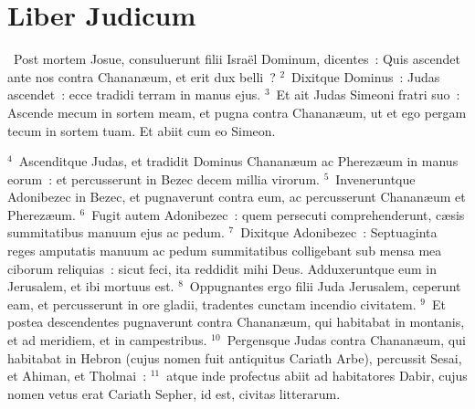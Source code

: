{\centering \section*{Liber Judicum}}\thispagestyle{empty}

~Post mortem Josue, consuluerunt filii Isra\"el Dominum, dicentes~: Quis ascendet ante nos contra Chanan\ae um, et erit dux belli~?
${}^{2}$~Dixitque Dominus~: Judas ascendet~: ecce tradidi terram in manus ejus.
${}^{3}$~Et ait Judas Simeoni fratri suo~: Ascende mecum in sortem meam, et pugna contra Chanan\ae um, ut et ego pergam tecum in sortem tuam. Et abiit cum eo Simeon.


${}^{4}$~Ascenditque Judas, et tradidit Dominus Chanan\ae um ac Pherez\ae um in manus eorum~: et percusserunt in Bezec decem millia virorum.
${}^{5}$~Inveneruntque Adonibezec in Bezec, et pugnaverunt contra eum, ac percusserunt Chanan\ae um et Pherez\ae um.
${}^{6}$~Fugit autem Adonibezec~: quem persecuti comprehenderunt, c\ae sis summitatibus manuum ejus ac pedum.
${}^{7}$~Dixitque Adonibezec~: Septuaginta reges amputatis manuum ac pedum summitatibus colligebant sub mensa mea ciborum reliquias~: sicut feci, ita reddidit mihi Deus. Adduxeruntque eum in Jerusalem, et ibi mortuus est.
${}^{8}$~Oppugnantes ergo filii Juda Jerusalem, ceperunt eam, et percusserunt in ore gladii, tradentes cunctam incendio civitatem.
${}^{9}$~Et postea descendentes pugnaverunt contra Chanan\ae um, qui habitabat in montanis, et ad meridiem, et in campestribus.
${}^{10}$~Pergensque Judas contra Chanan\ae um, qui habitabat in Hebron (cujus nomen fuit antiquitus Cariath Arbe), percussit Sesai, et Ahiman, et Tholmai~:
${}^{11}$~atque inde profectus abiit ad habitatores Dabir, cujus nomen vetus erat Cariath Sepher, id est, civitas litterarum.


